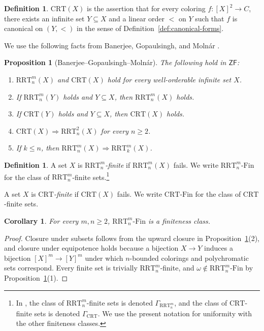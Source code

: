 \documentclass[11pt]{amsart}
\newtheorem{proposition}[theorem]{Proposition}
\newtheorem{corollary}[theorem]{Corollary}
\theoremstyle{definition}
\newtheorem{definition}[theorem]{Definition}
\newcommand{\ZF}{\mathsf{ZF}}
\newcommand{\RRT}{\mathrm{RRT}}
\newcommand{\CRT}{\mathrm{CRT}}
\newcommand{\RRTFin}[2]{\RRT^{#1}_{#2}\text{-}\mathrm{Fin}}
\newcommand{\CRTFin}{\CRT\text{-}\mathrm{Fin}}
\begin{document}
\begin{definition}\label{def:crt}
\(\CRT(X)\) is the assertion that for every coloring \(f:[X]^2\to C\), there exists an infinite set \(Y\subseteq X\) and a linear order \(<\) on \(Y\) such that \(f\) is canonical on \((Y,<)\) in the sense of Definition~\ref{def:canonical-forms}.
\end{definition}

We use the following facts from Banerjee, Gopaulsingh, and Moln\'ar \cite{BGM}.

\begin{proposition}[Banerjee--Gopaulsingh--Moln\'ar]\label{prop:bgm}
The following hold in \(\ZF\):
\begin{enumerate}[label=(\arabic*)]
    \item \(\RRT^m_n(X)\) and \(\CRT(X)\) hold for every well-orderable infinite set \(X\).
    \item If \(\RRT^m_n(Y)\) holds and \(Y\subseteq X\), then \(\RRT^m_n(X)\) holds.
    \item If \(\CRT(Y)\) holds and \(Y\subseteq X\), then \(\CRT(X)\) holds.
    \item \(\CRT(X)\Rightarrow \RRT^2_n(X)\) for every \(n\geq 2\).
    \item If \(k\leq n\), then \(\RRT^m_n(X)\Rightarrow \RRT^m_k(X)\).
\end{enumerate}
\end{proposition}

\begin{definition}
A set \(X\) is \emph{\(\RRT^m_n\)-finite} if \(\RRT^m_n(X)\) fails.  We write \(\RRTFin{m}{n}\) for the class of \(\RRT^m_n\)-finite sets.\footnote{In \cite{BGM}, the class of \(\RRT^m_n\)-finite sets is denoted \(\Gamma_{\RRT^m_n}\), and the class of \(\CRT\)-finite sets is denoted \(\Gamma_{\CRT}\).  We use the present notation for uniformity with the other finiteness classes.}

A set \(X\) is \emph{\(\CRT\)-finite} if \(\CRT(X)\) fails.  We write \(\CRTFin\) for the class of \(\CRT\)-finite sets.
\end{definition}

\begin{corollary}\label{cor:rrt-fin-class}
For every \(m,n\geq 2\), \(\RRTFin{m}{n}\) is a finiteness class.
\end{corollary}

\begin{proof}
Closure under subsets follows from the upward closure in Proposition~\ref{prop:bgm}(2), and closure under equipotence holds because a bijection \(X\to Y\) induces a bijection \([X]^m\to[Y]^m\) under which \(n\)-bounded colorings and polychromatic sets correspond.  Every finite set is trivially \(\RRT^m_n\)-finite, and \(\omega\notin\RRTFin{m}{n}\) by Proposition~\ref{prop:bgm}(1).
\end{proof}
\end{document}
